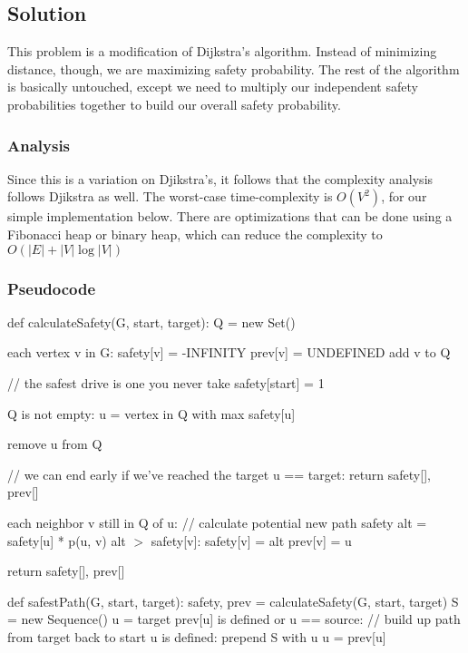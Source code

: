 \subsection*{Solution}

This problem is a modification of Dijkstra's algorithm. Instead of minimizing distance, though, we are maximizing safety probability. The rest of the algorithm is basically untouched, except we need to multiply our independent safety probabilities together to build our overall safety probability.

\subsubsection*{Analysis}

Since this is a variation on Djikstra's, it follows that the complexity analysis follows Djikstra as well. The worst-case time-complexity is $O(V^2)$, for our simple implementation below. There are optimizations that can be done using a Fibonacci heap or binary heap, which can reduce the complexity to $O(|E| + |V| \log |V|)$

\subsubsection*{Pseudocode}
\begin{codebox}
\li def calculateSafety(G, start, target):
\Then
  \li  Q = new Set()

  \li
  \li \For each vertex v in G:
  \Then
    \li  safety[v] = -INFINITY
    \li  prev[v] = UNDEFINED
    \li  add v to Q
  \End

  \li
  \li // the safest drive is one you never take
  \li safety[start] = 1 
  
  \li
  \li \While Q is not empty:
  \Then
    \li u = vertex in Q with max safety[u]

    \li remove u from Q

    \li // we can end early if we've reached the target
    \li \If u == target:
    \Then
      \li return safety[], prev[]
    \End

    \li \For each neighbor v still in Q of u:
    \Then
      \li // calculate potential new path safety 
      \li alt = safety[u] * p(u, v)
      \li \If alt $>$ safety[v]:
      \Then
        \li safety[v] = alt
        \li prev[v] = u
      \End
    \End  
  \End

  \li return safety[], prev[]
\End
\li 

\li def safestPath(G, start, target):
\Then
  \li safety, prev = calculateSafety(G, start, target)
  \li 
  \li S = new Sequence()
  \li u = target
  \li \If prev[u] is defined or u == source:
  \Then
    \li // build up path from target back to start
    \li \While u is defined:
    \Then
      \li prepend S with u
      \li u = prev[u]
    \End
  \End

\end{codebox}
